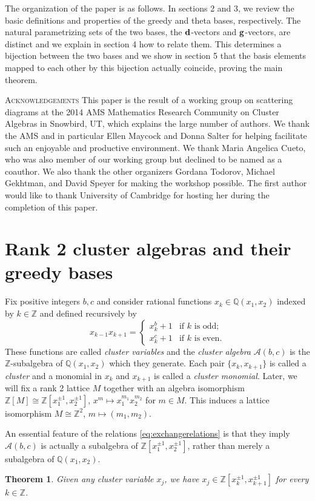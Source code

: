 \documentclass[11pt]{amsart}
\newtheorem{theorem}{Theorem}[section]
\theoremstyle{remark}
\numberwithin{equation}{section}
\newcommand{\QQ}{\mathbb{Q}}
\newcommand{\ZZ}{\mathbb{Z}}
\newcommand{\cA}{\mathcal{A}}
\newcommand{\bfd}{{\bf d}}
\newcommand{\bfg}{{\bf g}}
\begin{document}
The organization of the paper is as follows.  In sections 2 and 3, we review the basic definitions and properties of the greedy and theta bases, respectively.  The natural parametrizing sets of the two bases, the $\bfd$-vectors and $\bfg$-vectors, are distinct and we explain in section 4 how to relate them.  This determines a bijection between the two bases and we show in section 5 that the basis elements mapped to each other by this bijection actually coincide, proving the main theorem.

\textsc{Acknowledgements} This paper is the result of a working group on scattering diagrams at the 2014 AMS Mathematics Research Community on Cluster Algebras in Snowbird, UT, which explains the large number of authors.  We thank the AMS and in particular Ellen Maycock and Donna Salter for helping facilitate such an enjoyable and productive environment.  We thank Maria Angelica Cueto, who was also member of our working group but declined to be named as a coauthor.  We also thank the other organizers Gordana Todorov, Michael Gekhtman, and David Speyer for making the workshop possible. The first author would like to thank University of Cambridge for hosting her during the completion of this paper.

\section{Rank 2 cluster algebras and their greedy bases}
Fix positive integers $b,c$ and consider rational functions $x_k\in\QQ(x_1,x_2)$ indexed by $k\in\ZZ$ and defined recursively by 
\begin{equation}\label{eq:exchangerelations}
  x_{k-1}x_{k+1}=
  \begin{cases}
    x_k^b+1 & \text{if $k$ is odd;}\\
    x_k^c+1 & \text{if $k$ is even.}
  \end{cases}
\end{equation}
These functions are called \emph{cluster variables} and the \emph{cluster
algebra} $\cA(b,c)$ is the $\ZZ$-subalgebra of $\QQ(x_1,x_2)$ which they
generate.  Each pair $\{x_k, x_{k+1}\}$ is called a \emph{cluster} and a monomial in $x_k$ and $x_{k+1}$ is called a \emph{cluster monomial}.  Later, we will fix a rank 2 lattice $M$ together with an algebra isomorphism $\ZZ[M] \cong \ZZ[x_1^{\pm1},x_2^{\pm1}]$, $x^m\mapsto x_1^{m_1}x_2^{m_2}$ for $m \in M$.  This induces a lattice isomorphism $M \cong \ZZ^2$, $m \mapsto (m_1,m_2)$.

An essential feature of the relations \eqref{eq:exchangerelations} is that they imply $\cA(b,c)$ is actually a subalgebra of $\ZZ[x_1^{\pm1},x_2^{\pm1}]$, rather than merely a subalgebra of $\QQ(x_1,x_2)$.
\begin{theorem}\label{th:Laurent}
\cite[Theorem~3.1]{FZ} Given any cluster variable $x_j$, we have $x_j\in\ZZ[x_k^{\pm1},x_{k+1}^{\pm1}]$ for every $k \in \ZZ$.
\end{theorem}
\end{document}

